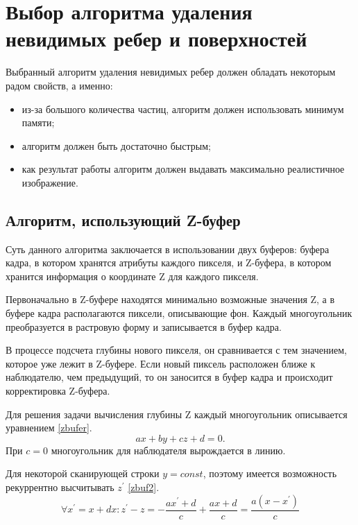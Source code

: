 \section{Выбор алгоритма удаления невидимых ребер и поверхностей}
 
Выбранный алгоритм удаления невидимых ребер должен обладать некоторым радом свойств, а именно:
\begin{itemize}[label=---]
	\item из-за большого количества частиц, алгоритм должен использовать минимум памяти;
	\item алгоритм должен быть достаточно быстрым;
	\item как результат работы алгоритм должен выдавать максимально реалистичное изображение.
\end{itemize}

\subsection{Алгоритм, использующий Z-буфер}

Суть данного алгоритма заключается в использовании двух буферов: буфера кадра, в котором хранятся атрибуты каждого пикселя, и Z-буфера, в котором хранится информация о координате Z для каждого пикселя. 

Первоначально в Z-буфере находятся минимально возможные значения Z, а в буфере кадра располагаются пиксели, описывающие фон. Каждый многоугольник преобразуется в растровую форму и записывается в буфер кадра. 

В процессе подсчета глубины нового пикселя, он сравнивается с тем значением, которое уже лежит в Z-буфере. Если новый пиксель расположен ближе к наблюдателю, чем предыдущий, то он заносится в буфер кадра и происходит корректировка Z-буфера.
 
Для решения задачи вычисления глубины Z каждый многоугольник описывается уравнением \ref{zbufer}.
\begin{equation}
	\label{zbufer}
	 ax+by+cz+d=0.
\end{equation}  
При $c=0$ многоугольник для наблюдателя вырождается в линию. 

Для некоторой сканирующей строки $y=const$, поэтому имеется возможность рекуррентно высчитывать $z^\prime$ \ref{zbuf2}.
\begin{equation}
	\label{zbuf2}
	\forall x^\prime=x+dx : z^\prime-z=-\frac{ax^\prime+d}{c}+\frac{ax+d}{c}=\frac{a(x-x^\prime)}{c}
\end{equation}

